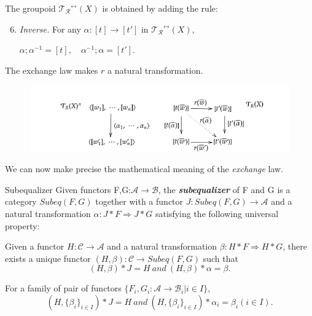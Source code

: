 \documentclass{beamer}
\begin{document}
\begin{frame}
    
    The groupoid $\mathcal{T_R}^{\leftrightarrow}(X)$ is obtained by adding the rule:
    \begin{enumerate}
        \setcounter{enumi}{5}
        \item  \emph{Inverse.} For any $\alpha:[t] \rightarrow [t']$ in $\mathcal{T_R}^{\leftrightarrow}(X)$, 
    
        $ \alpha;\alpha^{-1} = [t],\quad \alpha^{-1};\alpha= [t'].$
    \end{enumerate}
    \pause
    The exchange law makes $r$ a natural transformation.
    \begin{figure}
        
        \includegraphics[width=\textwidth, height=\textheight,keepaspectratio]{img/nattr.png}
    \end{figure}
\end{frame}
\begin{frame}
    We can now make precise the mathematical meaning of the \emph{exchange} law.
    
    \pause 
    \begin{block}{Subequalizer}
        Given functors F,G:$\mathcal{A} \rightarrow \mathcal{B}$, the \textbf{\emph{subequalizer}} of F and G is a 
        category $Subeq(F,G)$ together with a functor $J:Subeq(F,G) \rightarrow \mathcal{A}$ and a natural transformation 
        $\alpha: J *  F \Rightarrow J * G$ satisfying the following universal property:

        \bigskip
        Given a functor $H:\mathcal{C} \rightarrow \mathcal{A}$ and  a natural transformation $\beta:H*F \Rightarrow H*G$, there exists a unique functor 
        $ (H,\beta):\mathcal{C} \rightarrow Subeq(F,G)$ such that 
        $$ (H,\beta) * J = H\ and\ (H,\beta)*\alpha = \beta.$$ 

        For a family of pair of functors $\{F_i,G_i:\mathcal{A} \rightarrow \mathcal{B}_i | i \in I\}$,
        $$ (H,\{\beta_i\}_{i \in I}) * J = H\ and\ (H,\{\beta_i\}_{i \in I})*\alpha_i = \beta_i (i \in I).$$ 
    \end{block}
    

\end{frame}
\end{document}
